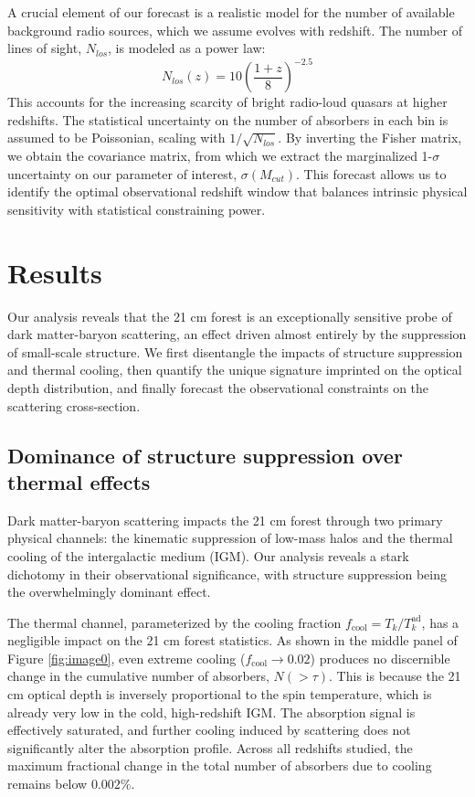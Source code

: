 \documentclass[]{article}
\begin{document}
A crucial element of our forecast is a realistic model for the number of available background radio sources, which we assume evolves with redshift. The number of lines of sight, $N_{los}$, is modeled as a power law:
\begin{equation}
N_{los}(z) = 10 \left( \frac{1+z}{8} \right)^{-2.5}
\end{equation}
This accounts for the increasing scarcity of bright radio-loud quasars at higher redshifts. The statistical uncertainty on the number of absorbers in each bin is assumed to be Poissonian, scaling with $1/\sqrt{N_{los}}$. By inverting the Fisher matrix, we obtain the covariance matrix, from which we extract the marginalized 1-$\sigma$ uncertainty on our parameter of interest, $\sigma(M_{cut})$. This forecast allows us to identify the optimal observational redshift window that balances intrinsic physical sensitivity with statistical constraining power.

\section{Results}
\label{sec:results}
Our analysis reveals that the 21 cm forest is an exceptionally sensitive probe of dark matter-baryon scattering, an effect driven almost entirely by the suppression of small-scale structure. We first disentangle the impacts of structure suppression and thermal cooling, then quantify the unique signature imprinted on the optical depth distribution, and finally forecast the observational constraints on the scattering cross-section.

\subsection{Dominance of structure suppression over thermal effects}

Dark matter-baryon scattering impacts the 21 cm forest through two primary physical channels: the kinematic suppression of low-mass halos and the thermal cooling of the intergalactic medium (IGM). Our analysis reveals a stark dichotomy in their observational significance, with structure suppression being the overwhelmingly dominant effect.

The thermal channel, parameterized by the cooling fraction $f_{\text{cool}} = T_k / T_k^{\text{ad}}$, has a negligible impact on the 21 cm forest statistics. As shown in the middle panel of Figure \ref{fig:image0}, even extreme cooling ($f_{\text{cool}} \to 0.02$) produces no discernible change in the cumulative number of absorbers, $N(>\tau)$. This is because the 21 cm optical depth is inversely proportional to the spin temperature, which is already very low in the cold, high-redshift IGM. The absorption signal is effectively saturated, and further cooling induced by scattering does not significantly alter the absorption profile. Across all redshifts studied, the maximum fractional change in the total number of absorbers due to cooling remains below $0.002\%$.
\end{document}
